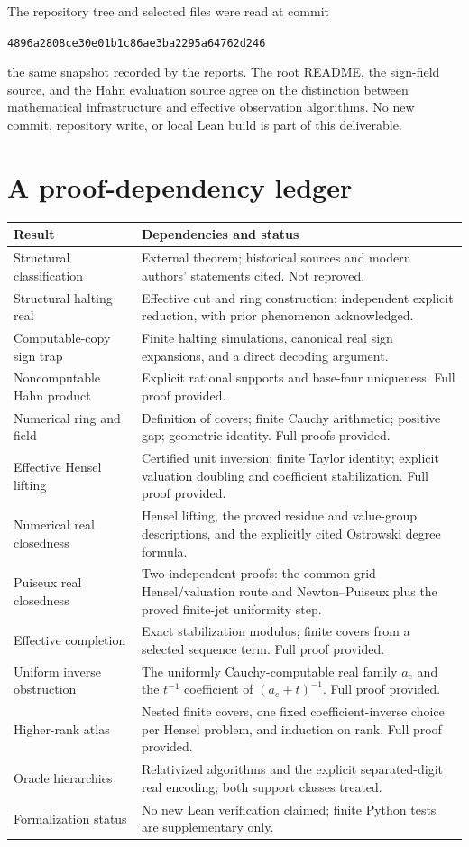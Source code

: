\documentclass[11pt,letterpaper]{article}
\numberwithin{equation}{section}
\theoremstyle{definition}
\theoremstyle{remark}
\begin{document}
The repository tree and selected files were read at commit
\begin{center}\texttt{4896a2808ce30e01b1c86ae3ba2295a64762d246}\end{center}
the same snapshot recorded by the reports. The root README, the sign-field source, and the
Hahn evaluation source agree on the distinction between mathematical
infrastructure and effective observation algorithms. No new commit,
repository write, or local Lean build is part of this deliverable.

\clearpage
\section{A proof-dependency ledger}

\begin{longtable}{@{}p{}p{}@{}}
\toprule
Result & Dependencies and status \\
\midrule
\endhead
Structural classification & External theorem; historical sources and modern authors' statements cited. Not reproved. \\
Structural halting real & Effective cut and ring construction; independent explicit reduction, with prior phenomenon acknowledged. \\
Computable-copy sign trap & Finite halting simulations, canonical real sign expansions, and a direct decoding argument. \\
Noncomputable Hahn product & Explicit rational supports and base-four uniqueness. Full proof provided. \\
Numerical ring and field & Definition of covers; finite Cauchy arithmetic; positive gap; geometric identity. Full proofs provided. \\
Effective Hensel lifting & Certified unit inversion; finite Taylor identity; explicit valuation doubling and coefficient stabilization. Full proof provided. \\
Numerical real closedness & Hensel lifting, the proved residue and value-group descriptions, and the explicitly cited Ostrowski degree formula. \\
Puiseux real closedness & Two independent proofs: the common-grid Hensel/valuation route and Newton--Puiseux plus the proved finite-jet uniformity step. \\
Effective completion & Exact stabilization modulus; finite covers from a selected sequence term. Full proof provided. \\
Uniform inverse obstruction & The uniformly Cauchy-computable real family $a_e$ and the $t^{-1}$ coefficient of $(a_e+t)^{-1}$. Full proof provided. \\
Higher-rank atlas & Nested finite covers, one fixed coefficient-inverse choice per Hensel problem, and induction on rank. Full proof provided. \\
Oracle hierarchies & Relativized algorithms and the explicit separated-digit real encoding; both support classes treated. \\
Formalization status & No new Lean verification claimed; finite Python tests are supplementary only. \\
\bottomrule
\end{longtable}
\end{document}

